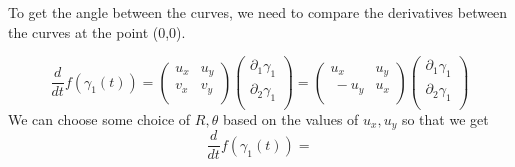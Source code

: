 \documentclass{homework}
\begin{document}
                                                             \begin{solution}
                                                             To get the angle between the curves, we need to compare the derivatives between the curves at the point (0,0).

                                                             \[\frac{d}{dt} f(\gamma_1(t)) = 
                                                             \begin{pmatrix}
                                                             u_x &u_y\\
                                                             v_x &v_y\\
                                                             \end{pmatrix}
                                                             \begin{pmatrix}
                                                             \partial_1\gamma_1\\
                                                             \partial_2\gamma_1\\
                                                             \end{pmatrix}
                                                             = 
                                                             \begin{pmatrix}
                                                             u_x & u_y\\\
                                                             -u_y & u_x\\
                                                             \end{pmatrix}
                                                             \begin{pmatrix}
                                                             \partial_1\gamma_1\\
                                                             \partial_2\gamma_1\\
                                                             \end{pmatrix}\]
                                                             We can choose some choice of $R, \theta$ based on the values of $u_x, u_y$ so that we get
                                                             \[\frac{d}{dt} f(\gamma_1(t)) = 
\]
\end{solution}
\end{document}
